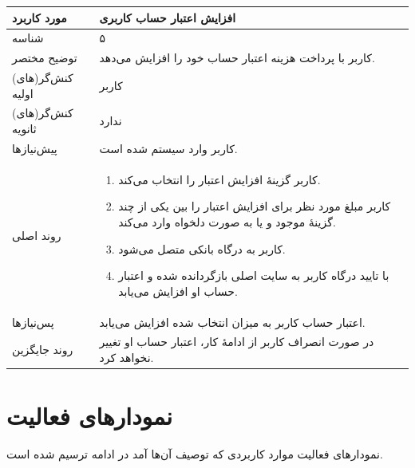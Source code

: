 \documentclass{article}
\begin{document}
\begin{center}
\bgroup
\def\arraystretch{1.5}
\begin{tabular} {|p{}|p{}|}
\hline
 مورد کاربرد & 
افزایش اعتبار حساب کاربری
\\ \hline
 شناسه &
۵
\\ \hline
توضیح مختصر &
کاربر با پرداخت هزینه اعتبار حساب خود را افزایش می‌دهد.
\\ \hline
کنش‌گر(های) اولیه &
کاربر
\\ \hline
کنش‌گر(های) ثانویه &
ندارد
\\ \hline
پیش‌نیازها &
کاربر وارد سیستم شده است.
\\ \hline
روند اصلی &
\begin{enumerate}[nosep,topsep=0cm]
\item
کاربر گزینهٔ افزایش اعتبار را انتخاب می‌کند.
\item
کاربر مبلغ مورد نظر برای افزایش اعتبار را بین یکی از چند گزینهٔ موجود و یا به صورت دلخواه وارد می‌کند.
\item
کاربر به درگاه بانکی متصل می‌شود.
\item
با تایید درگاه کاربر به سایت اصلی بازگردانده شده و اعتبار حساب او افزایش می‌یابد.
\end{enumerate}
\\ \hline
پس‌نیازها &
اعتبار حساب کاربر به میزان انتخاب شده افزایش می‌یابد.
\\ \hline
روند جایگزین &
در صورت انصراف کاربر از ادامهٔ کار، اعتبار حساب او تغییر نخواهد کرد.
\\ \hline
\end{tabular}
\egroup
\end{center}

\newpage

\section{نمودارهای فعالیت}

نمودارهای فعالیت موارد کاربردی که توصیف آن‌ها آمد در ادامه ترسیم شده است.
\end{document}
